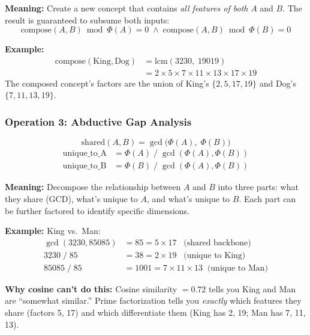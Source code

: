 \documentclass[10pt]{article}
\begin{document}
\noindent\textbf{Meaning:} Create a new concept that contains \emph{all features of both} $A$ and $B$. The result is guaranteed to subsume both inputs:
$$\text{compose}(A,B) \bmod \Phi(A) = 0 \;\wedge\; \text{compose}(A,B) \bmod \Phi(B) = 0$$

\noindent\textbf{Example:}
\begin{align*}
\text{compose}(\text{King}, \text{Dog}) &= \text{lcm}(3230,\; 19019) \\
  &= 2 \times 5 \times 7 \times 11 \times 13 \times 17 \times 19
\end{align*}
The composed concept's factors are the union of King's $\{2,5,17,19\}$ and Dog's $\{7,11,13,19\}$.

\subsubsection{Operation 3: Abductive Gap Analysis}

\begin{equation}
\boxed{\;\text{shared}(A,B) = \gcd\big(\Phi(A),\; \Phi(B)\big)\;}
\end{equation}
\vspace{-12pt}
\begin{align}
\text{unique\_to\_A} &= \Phi(A) \;/\; \gcd(\Phi(A), \Phi(B))  \label{eq:gap_a} \\
\text{unique\_to\_B} &= \Phi(B) \;/\; \gcd(\Phi(A), \Phi(B))  \label{eq:gap_b}
\end{align}

\noindent\textbf{Meaning:} Decompose the relationship between $A$ and $B$ into three parts: what they share (GCD), what's unique to $A$, and what's unique to $B$. Each part can be further factored to identify specific dimensions.

\smallskip\noindent\textbf{Example:} King vs.\ Man:
\begin{align*}
\gcd(3230, 85085) &= 85 = 5 \times 17 \;\;\;\text{(shared backbone)} \\
3230 \;/\; 85 &= 38 = 2 \times 19 \;\;\;\text{(unique to King)} \\
85085 \;/\; 85 &= 1001 = 7 \times 11 \times 13 \;\;\text{(unique to Man)}
\end{align*}

\noindent\textbf{Why cosine can't do this:} Cosine similarity $= 0.72$ tells you King and Man are ``somewhat similar.'' Prime factorization tells you \emph{exactly} which features they share (factors 5, 17) and which differentiate them (King has 2, 19; Man has 7, 11, 13).
\end{document}
